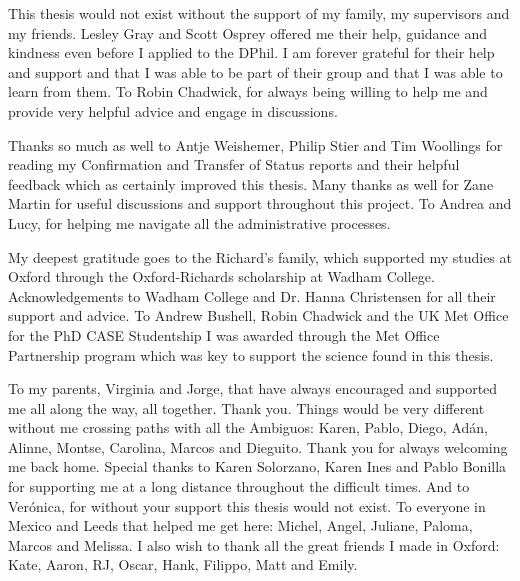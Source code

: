 
This thesis would not exist without the support of my family, my supervisors and my friends. 
Lesley Gray and Scott Osprey offered me their help, guidance and kindness even before I applied to the DPhil. I am forever grateful for their help and support and that I was able to be part of their group and that I was able to learn from them.
To Robin Chadwick, for always being willing to help me and provide very helpful advice and engage in discussions.

Thanks so much as well to Antje Weishemer, Philip Stier and Tim Woollings for reading my Confirmation and Transfer of Status reports and their helpful feedback which as certainly improved this thesis.  
Many thanks as well for Zane Martin for useful discussions and support throughout this project.
To Andrea and Lucy, for helping me navigate all the administrative processes.

My deepest gratitude goes to the Richard's family, which supported my studies at Oxford through the Oxford-Richards scholarship at Wadham College. Acknowledgements to Wadham College and Dr. Hanna Christensen for all their support and advice. 
To Andrew Bushell, Robin Chadwick and the UK Met Office for the PhD CASE Studentship I was awarded through the Met Office Partnership program which was key to support the science found in this thesis. 


To my parents, Virginia and Jorge, that have always encouraged and supported me all along the way, all together. Thank you. 
Things would be very different without me crossing paths with all the Ambiguos: Karen, Pablo, Diego, Adán, Alinne, Montse, Carolina, Marcos and Dieguito. Thank you for always welcoming me back home. 
Special thanks to Karen Solorzano, Karen Ines and Pablo Bonilla for supporting me at a long distance throughout the difficult times. 
And to Ver\'onica, for without your support this thesis would not exist. 
To everyone in Mexico and Leeds that helped me get here: Michel, Angel, Juliane, Paloma, Marcos and Melissa.  
 I also wish to thank all the great friends I made in Oxford: Kate, Aaron, RJ, Oscar, Hank, Filippo, Matt and Emily. 





